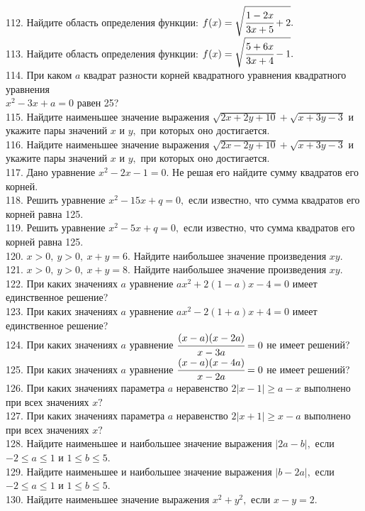 112. Найдите область определения функции: $f(x)=\sqrt{\cfrac{1-2x}{3x+5}+2}.$\\
113. Найдите область определения функции: $f(x)=\sqrt{\cfrac{5+6x}{3x+4}-1}.$\\
114. При каком $a$ квадрат разности корней квадратного уравнения квадратного уравнения\\ $x^2-3x+a=0$ равен 25?\\
115. Найдите наименьшее значение выражения $\sqrt{2x+2y+10}+\sqrt{x+3y-3}$ и укажите пары значений $x$ и $y,$ при которых оно достигается.\\
116. Найдите наименьшее значение выражения $\sqrt{2x-2y+10}+\sqrt{x+3y-3}$ и укажите пары значений $x$ и $y,$ при которых оно достигается.\\
117. Дано уравнение $x^2-2x-1=0.$ Не решая его найдите сумму квадратов его корней.\\
118. Решить уравнение $x^2-15x+q=0,$ если известно, что сумма квадратов его корней равна 125.\\
119. Решить уравнение $x^2-5x+q=0,$ если известно, что сумма квадратов его корней равна 125.\\
120. $x > 0,\ y > 0,\ x+y=6.$ Найдите наибольшее значение произведения $xy.$\\
121. $x > 0,\ y > 0,\ x+y=8.$ Найдите наибольшее значение произведения $xy.$\\
122. При каких значениях $a$ уравнение $ax^2+2(1-a)x-4=0$ имеет единственное решение?\\
123. При каких значениях $a$ уравнение $ax^2-2(1+a)x+4=0$ имеет единственное решение?\\
124. При каких значениях $a$ уравнение $\cfrac{(x-a)(x-2a)}{x-3a}=0$ не имеет решений?\\
125. При каких значениях $a$ уравнение $\cfrac{(x-a)(x-4a)}{x-2a}=0$ не имеет решений?\\
126. При каких значениях параметра $a$ неравенство $2|x-1|\geqslant a-x$ выполнено при всех значениях $x?$\\
127. При каких значениях параметра $a$ неравенство $2|x+1|\geqslant x-a$ выполнено при всех значениях $x?$\\
128. Найдите наименьшее и наибольшее значение выражения $|2a-b|,$ если $-2\leqslant a \leqslant 1$ и $1\leqslant b \leqslant 5.$\\
129. Найдите наименьшее и наибольшее значение выражения $|b-2a|,$ если $-2\leqslant a \leqslant 1$ и $1\leqslant b \leqslant 5.$\\
130. Найдите наименьшее значение выражения $x^2+y^2,$ если $x-y=2.$\\
